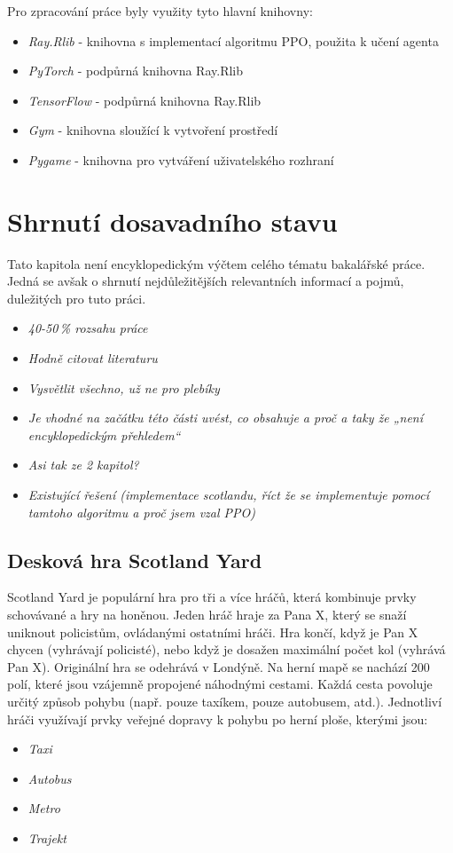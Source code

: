 Pro zpracování práce byly využity tyto hlavní knihovny:
\begin{itemize}
  \item \emph{Ray.Rlib} - knihovna s implementací algoritmu PPO, použita k učení agenta
  \item \emph{PyTorch} - podpůrná knihovna Ray.Rlib
  \item \emph{TensorFlow} - podpůrná knihovna Ray.Rlib
  \item \emph{Gym} - knihovna sloužící k vytvoření prostředí
  \item \emph{Pygame} - knihovna pro vytváření uživatelského rozhraní
\end{itemize}


\chapter{Shrnutí dosavadního stavu}
\label{ch:dosavadni_stav}
Tato kapitola není encyklopedickým výčtem celého tématu bakalářské práce.
Jedná se avšak o shrnutí nejdůležitějších relevantních informací a pojmů, duležitých pro tuto práci.

\begin{itemize}
  \item \emph {40-50\,\% rozsahu práce}
  \item \emph{Hodně citovat literaturu}
  \item \emph{Vysvětlit všechno, už ne pro plebíky}
  \item \emph{Je vhodné na začátku této části uvést, co obsahuje a proč a taky že „není encyklopedickým přehledem“}
  \item \emph{Asi tak ze 2 kapitol?}
  \item \emph{Existující řešení (implementace scotlandu, říct že se implementuje pomocí tamtoho algoritmu a proč jsem vzal PPO)}
\end{itemize}


\section{Desková hra Scotland Yard}
\label{sec:deskova-hra-scotland-yard}

Scotland Yard je populární hra pro tři a více hráčů, která kombinuje prvky schovávané a hry na honěnou.
Jeden hráč hraje za Pana X, který se snaží uniknout policistům, ovládanými ostatními hráči.
Hra končí, když je Pan X chycen (vyhrávají policisté), nebo když je dosažen maximální počet kol (vyhrává Pan X).
Originální hra se odehrává v Londýně.
Na herní mapě se nachází 200 polí, které jsou vzájemně propojené náhodnými cestami.
Každá cesta povoluje určitý způsob pohybu (např.
pouze taxíkem, pouze autobusem, atd.).
Jednotliví hráči využívají prvky veřejné dopravy k pohybu po herní ploše, kterými jsou:
\begin{itemize}
  \item \emph{Taxi}
  \item \emph{Autobus}
  \item \emph{Metro}
  \item \emph{Trajekt}
\end{itemize}

